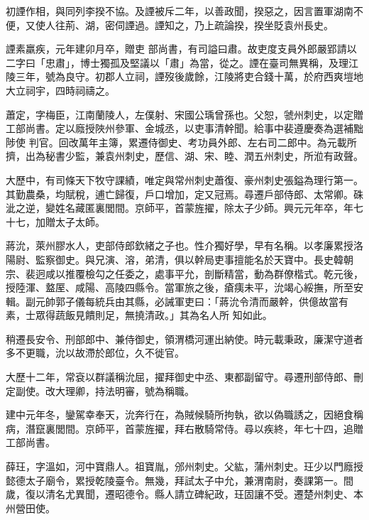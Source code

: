 \begin{pinyinscope}
 初諲作相，與同列李揆不協。及諲被斥二年，以善政聞，揆惡之，因言置軍湖南不便，又使人往荊、湖，密伺諲過。諲知之，乃上疏論揆，揆坐貶袁州長史。



 諲素羸疾，元年建卯月卒，贈吏
 部尚書，有司謚曰肅。故吏度支員外郎嚴郢請以二字曰「忠肅」，博士獨孤及堅議以「肅」為當，從之。諲在臺司無異稱，及理江陵三年，號為良守。初郡人立祠，諲歿後歲餘，江陵將吏合錢十萬，於府西爽塏地大立祠宇，四時祠禱之。



 蕭定，字梅臣，江南蘭陵人，左僕射、宋國公瑀曾孫也。父恕，虢州刺史，以定贈工部尚書。定以廕授陜州參軍、金城丞，以吏事清幹聞。給事中裴遵慶奏為選補黜陟使
 判官。回改萬年主簿，累遷侍御史、考功員外郎、左右司二郎中。為元載所擠，出為秘書少監，兼袁州刺史，歷信、湖、宋、睦、潤五州刺史，所涖有政聲。



 大歷中，有司條天下牧守課績，唯定與常州刺史蕭復、豪州刺史張鎰為理行第一。其勤農桑，均賦稅，逋亡歸復，戶口增加，定又冠焉。尋遷戶部侍郎、太常卿。硃泚之逆，變姓名藏匿裏閭間。京師平，首蒙旌擢，除太子少師。興元元年卒，年七十七，加贈太子太師。



 蔣沇，萊州膠水人，吏部侍郎欽緒之子也。性介獨好學，早有名稱。以孝廉累授洛陽尉、監察御史。與兄演、溶，弟清，俱以幹局吏事擅能名於天寶中。長史韓朝宗、裴迥咸以推覆檢勾之任委之，處事平允，剖斷精當，動為群僚楷式。乾元後，授陸渾、盩厔、咸陽、高陵四縣令。當軍旅之後，瘡痍未平，沇竭心綏撫，所至安輯。副元帥郭子儀每統兵由其縣，必誡軍吏曰：「蔣沇令清而嚴幹，供億故當有素，士眾得蔬飯見饋則足，無撓清政。」其為名人所
 知如此。



 稍遷長安令、刑部郎中、兼侍御史，領渭橋河運出納使。時元載秉政，廉潔守道者多不更職，沇以故滯於郎位，久不徙官。



 大歷十二年，常袞以群議稱沇屈，擢拜御史中丞、東都副留守。尋遷刑部侍郎、刪定副使。改大理卿，持法明審，號為稱職。



 建中元年冬，鑾駕幸奉天，沇奔行在，為賊候騎所拘執，欲以偽職誘之，因絕食稱病，潛竄裏閭間。京師平，首蒙旌擢，拜右散騎常侍。尋以疾終，年七十四，追贈工部尚書。



 薛玨，字溫如，河中寶鼎人。祖寶胤，邠州刺史。父紘，蒲州刺史。玨少以門廕授懿德太子廟令，累授乾陵臺令。無幾，拜試太子中允，兼渭南尉，奏課第一。間歲，復以清名尤異聞，遷昭德令。縣人請立碑紀政，玨固讓不受。遷楚州刺史、本州營田使。




\end{pinyinscope}
